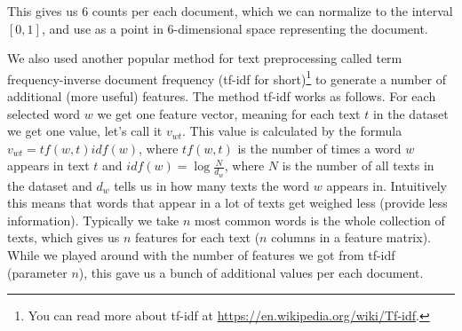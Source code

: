 This gives us 6 counts per each document, which we can normalize to the
interval $[0, 1]$, and use as a point in $6$-dimensional space representing
the document.

We also used another popular method for text preprocessing called term
frequency-inverse document frequency (tf-idf for short)\footnote{You can read
more about tf-idf at \url{https://en.wikipedia.org/wiki/Tf-idf}.} to generate a
number of additional (more useful) features. The method tf-idf works as
follows. For each selected word $w$  we get one feature vector, meaning for
each text $t$ in the dataset we get one value, let's call it $v_{wt}$.  This
value is calculated by the formula $v_{wt} = tf(w, t)idf(w)$, where $tf(w, t)$
is the number of times a word $w$ appears in text $t$ and $idf(w) =
\log\frac{N}{d_{w}}$, where $N$ is the number of all texts in the dataset and
$d_{w}$ tells us in how many texts the word $w$ appears in. Intuitively this
means that words that appear in a lot of texts get weighed less (provide less
information). Typically we take $n$ most common words is the whole collection of
texts, which gives us $n$ features for each text ($n$ columns in a feature
matrix). While we played around with the number of features we got from tf-idf
(parameter $n$), this gave us a bunch of additional values per each document.
